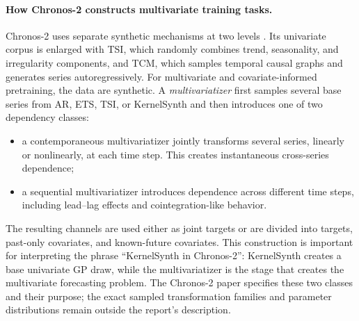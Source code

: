 \paragraph{How Chronos-2 constructs multivariate training tasks.}
Chronos-2 uses separate synthetic mechanisms at two levels
\citep{ansari2025chronos2}. Its univariate corpus is enlarged with TSI, which
randomly combines trend, seasonality, and irregularity components, and TCM,
which samples temporal causal graphs and generates series autoregressively.
For multivariate and covariate-informed pretraining, the data are synthetic.
A \emph{multivariatizer} first samples several base series from AR, ETS, TSI,
or KernelSynth and then introduces one of two dependency classes:

\begin{itemize}
    \item a contemporaneous multivariatizer jointly transforms several series,
    linearly or nonlinearly, at each time step. This creates instantaneous
    cross-series dependence;
    \item a sequential multivariatizer introduces dependence across different
    time steps, including lead--lag effects and cointegration-like behavior.
\end{itemize}

The resulting channels are used either as joint targets or are divided into
targets, past-only covariates, and known-future covariates. This construction
is important for interpreting the phrase ``KernelSynth in Chronos-2'':
KernelSynth creates a base univariate GP draw, while the multivariatizer is the
stage that creates the multivariate forecasting problem. The Chronos-2 paper
specifies these two classes and their purpose; the exact sampled transformation
families and parameter distributions remain outside the report's description.

